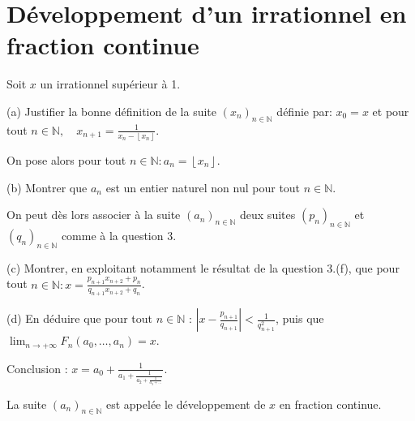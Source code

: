 \documentclass[10pt]{article}
\begin{document}
\section{Développement d'un irrationnel en fraction continue}
Soit $x$ un irrationnel supérieur à 1.

(a) Justifier la bonne définition de la suite $\left(x_{n}\right)_{n \in \mathbb{N}}$ définie par: $x_{0}=x$ et pour tout $n \in \mathbb{N}, \quad x_{n+1}=\frac{1}{x_{n}-\left\lfloor x_{n}\right\rfloor}$.

On pose alors pour tout $n \in \mathbb{N}: a_{n}=\left\lfloor x_{n}\right\rfloor$.

(b) Montrer que $a_{n}$ est un entier naturel non nul pour tout $n \in \mathbb{N}$.

On peut dès lors associer à la suite $\left(a_{n}\right)_{n \in \mathbb{N}}$ deux suites $\left(p_{n}\right)_{n \in \mathbb{N}}$ et $\left(q_{n}\right)_{n \in \mathbb{N}}$ comme à la question 3.

(c) Montrer, en exploitant notamment le résultat de la question 3.(f), que pour tout $n \in \mathbb{N}: x=\frac{p_{n+1} x_{n+2}+p_{n}}{q_{n+1} x_{n+2}+q_{n}}$.

(d) En déduire que pour tout $n \in \mathbb{N}$ : $\left|x-\frac{p_{n+1}}{q_{n+1}}\right|<\frac{1}{q_{n+1}^{2}}$, puis que $\lim _{n \rightarrow+\infty} F_{n}\left(a_{0}, \ldots, a_{n}\right)=x$.

Conclusion : $x=a_{0}+\frac{1}{a_{1}+\frac{1}{a_{2}+\frac{1}{a_{3}+\ldots}}}$.

La suite $\left(a_{n}\right)_{n \in \mathbb{N}}$ est appelée le développement de $x$ en fraction continue.
\end{document}
